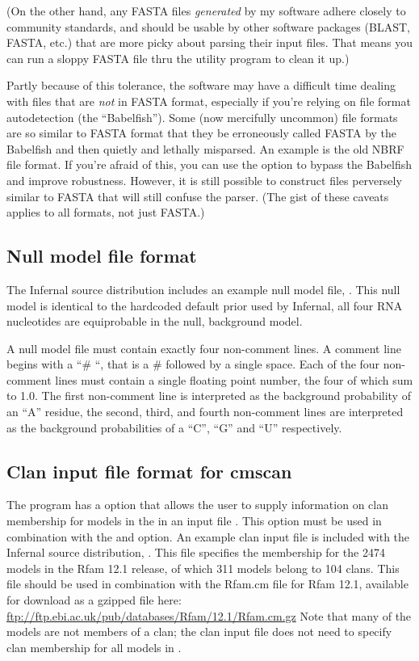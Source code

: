 (On the other hand, any FASTA files \emph{generated} by my software
adhere closely to community standards, and should be usable by other
software packages (BLAST, FASTA, etc.) that are more picky about
parsing their input files. That means you can run a sloppy FASTA file
thru the  utility program to clean it up.)

Partly because of this tolerance, the software may have a difficult
time dealing with files that are \textit{not} in FASTA format,
especially if you're relying on file format autodetection (the
``Babelfish'').  Some (now mercifully uncommon) file formats are so
similar to FASTA format that they be erroneously called FASTA by the
Babelfish and then quietly and lethally misparsed. An example is the
old NBRF file format. If you're afraid of this, you can use the
 option to bypass the Babelfish and improve
robustness. However, it is still possible to construct files
perversely similar to FASTA that will still confuse the parser.  (The
gist of these caveats applies to all formats, not just FASTA.)

\subsection{Null model file format}

The Infernal source distribution includes an example null model file, 
. This null model is identical to the hardcoded default
prior used by Infernal, all four RNA nucleotides are equiprobable in
the null, background model. 

A null model file must contain exactly four non-comment lines. A
comment line begins with a ``\# ``, that is a \# followed by a single
space. Each of the four non-comment lines must contain a single floating point
number, the four of which sum to 1.0. The first non-comment line is interpreted as
the background probability of an ``A'' residue, the second, third, and
fourth non-comment lines are interpreted as the background
probabilities of a ``C'', ``G'' and ``U'' respectively. 

\subsection{Clan input file format for cmscan}

The  program has a  option that
allows the user to supply information on clan membership for models in
the  in an input file . This option must be
used in combination with the  and 
option. An example clan input file is included with the Infernal
source distribution, . This file specifies
the membership for the 2474 models in the Rfam 12.1 release, of which
311 models belong to 104 clans. This file should be used in
combination with the Rfam.cm file for Rfam 12.1, available for
download as a gzipped file here:
\url{ftp://ftp.ebi.ac.uk/pub/databases/Rfam/12.1/Rfam.cm.gz} Note that
many of the models are not members of a clan; the clan input file does
not need to specify clan membership for all models in
.


